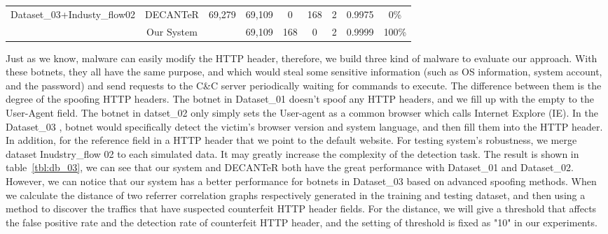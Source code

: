 \begin{table*}[!h]
\begin{tabular}{|c|c|c|c|c|c|c|c|c|}
\multirow{2}{*}{Dataset\_03+Industy\_flow02} & DECANTeR   \cite{bortolameotti2017decanter}              & \multirow{2}{*}{69,279}        & 69,109     & 0       & 168     & 2      & 0.9975                    & 0\%                                                                                               \\ \cline{2-2} \cline{4-9} 
                                             & Our System              &                                & 69,109     & 168     & 0       & 2      & 0.9999                    & 100\%                                                                                             \\ \hline\hline
\end{tabular}
\end{table*}



Just as we know, malware can easily modify the HTTP header, therefore, we build three kind of malware to evaluate our approach. With these botnets, they all have the same purpose, and which would steal some sensitive information (such as OS information, system account, and the password) and send requests to the C\&C server periodically waiting for commands to execute. The difference between them is the degree of the spoofing HTTP headers. The botnet in Dataset\_01 doesn't spoof any HTTP headers, and we fill up with the empty to the User-Agent field. The botnet in datset\_02 only simply sets the User-agent as a common browser which calls Internet Explore (IE). In the Dataset\_03 , botnet would specifically detect the victim's browser version and system language, and then fill them into the HTTP header. In addition, for the reference field in a HTTP header that we point to the default website. For testing system's robustness, we merge dataset Inudstry\_flow 02 to each simulated data. It may greatly increase the complexity of the detection task. The result is shown in table~\ref{tbl:db_03}, we can see that our system and DECANTeR \cite{bortolameotti2017decanter} both have the great performance with Dataset\_01 and Dataset\_02. However, we can notice that our system has a better performance for botnets in Dataset\_03 based on advanced spoofing methods. When we calculate the distance of two referrer correlation graphs respectively generated in the training and testing dataset, and then using a method to discover the traffics that have suspected counterfeit HTTP header fields. For the distance, we will give a threshold that affects the false positive rate and the detection rate of counterfeit HTTP header, and the setting of threshold is fixed as "10" in our experiments.

